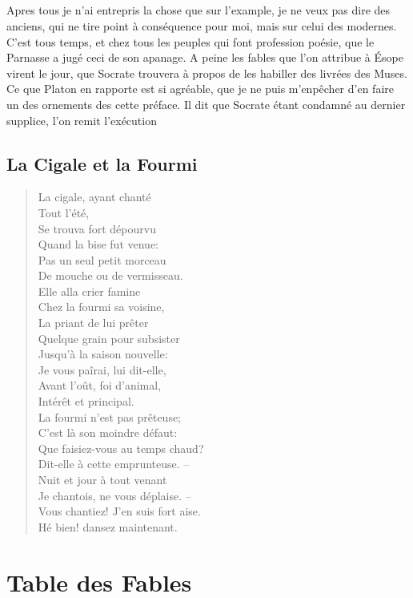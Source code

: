 \documentclass{book}
\newenvironment{fable}[1]{\section{#1}\begin{verse}}{\end{verse}}
\begin{document}
\paragraph{}
Apres tous je n'ai entrepris la chose que sur l'example, je ne veux pas dire des anciens, qui ne tire point \`a cons\'equence pour moi, mais sur celui des modernes. C'est tous temps, et chez tous les peuples qui font profession po\'esie, que le Parnasse a jug\'e ceci de son apanage. A peine les fables que l'on attribue \`a \'Esope virent le jour, que Socrate trouvera \`a propos de les habiller des livr\'ees des Muses. Ce que Platon en rapporte est si agr\'eable, que je ne puis m'enp\^echer d'en faire un des ornements des cette pr\'eface. Il dit que Socrate \'etant condamn\'e au dernier supplice, l'on remit l'ex\'ecution 
\mainmatter
\begin{fable}{La Cigale et la Fourmi}
La cigale, ayant chant\'e\\
Tout l'\'et\'e,\\
Se trouva fort d\'epourvu\\
Quand la bise fut venue:\\
Pas un seul petit morceau\\
De mouche ou de vermisseau.\\
Elle alla crier famine\\
Chez la fourmi sa voisine,\\
La priant de lui pr\^eter\\

Quelque grain pour subsister\\
Jusqu'\`a la saison nouvelle:\\
Je vous pa\^irai, lui dit-elle,\\
Avant l'o\^ut, foi d'animal,\\
Int\'er\^et et principal.\\
La fourmi n'est pas pr\^eteuse;\\
C'est l\`a son moindre d\'efaut:\\
Que faisiez-vous au temps chaud?\\
Dit-elle \`a cette emprunteuse. --\\
Nuit et jour \`a tout venant\\
Je chantois, ne vous d\'eplaise. --\\
Vous chantiez! J'en suis fort aise.\\
H\'e bien! dansez maintenant.
\end{fable}

\backmatter
\chapter*{Table des Fables}
\end{document}
